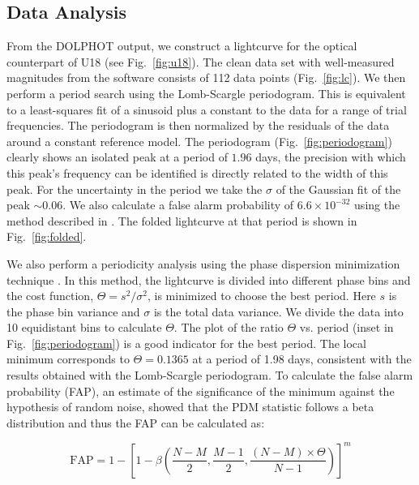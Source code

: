 \documentclass[fleqn,usenatbib,useAMS,letters]{mnras}
\begin{document}
 
 \subsection{Data Analysis}
 
From the DOLPHOT output, we construct a lightcurve for the optical counterpart of U18 (see Fig.~\ref{fig:u18}). The clean data set with well-measured magnitudes from the software consists of 112 data points (Fig.~\ref{fig:lc}). %
We then perform a period search using the Lomb-Scargle \citep{1976Ap&SS..39..447L,1982ApJ...263..835S} periodogram. This is equivalent to a least-squares fit of a sinusoid plus a constant to the data for a range of trial frequencies. The periodogram is then normalized by the residuals of the data around a constant reference model. The periodogram %
(Fig.~\ref{fig:periodogram}) clearly shows an isolated peak at a period of $1.96$ days, the precision with which this peak’s frequency can be identified is directly related to the width of this peak. For the uncertainty in the period we take the $\sigma$ of the Gaussian fit of the peak $\sim 0.06$. We also calculate a false alarm probability of $6.6\times 10^{-32}$ using the method described in \cite{Baluev}. The folded lightcurve at that period is shown in Fig.~\ref{fig:folded}.




We also perform a periodicity analysis using the phase dispersion minimization technique  \citep[PDM][]{PDMStellingwerf78}. In this method, the lightcurve is divided into different phase bins and the cost function, $\Theta =s^2/\sigma^2$, is minimized to choose the best period. 
Here $s$ is the phase bin variance and $\sigma$ is the total data variance. We divide the data into 10 equidistant bins to calculate $\Theta$. The plot of the ratio $\Theta$ vs. period (inset in Fig.~\ref{fig:periodogram}) is a good indicator for the best  period. %
The local minimum corresponds to $\Theta = 0.1365$ at a period of 1.98 days, consistent with the results obtained with the Lomb-Scargle periodogram. To calculate the false alarm probability (FAP), an estimate of the significance of the minimum against the hypothesis of random noise, \cite{pdmbeta97} showed that the PDM statistic follows a beta distribution and thus the FAP can be calculated as:

$$\text{FAP} = 1-\left [ 1 - \beta\left ( \frac{N-M}{2},\frac{M-1}{2},\frac{(N-M)\times \Theta}{N-1}\right )\right ]^m$$
\end{document}
